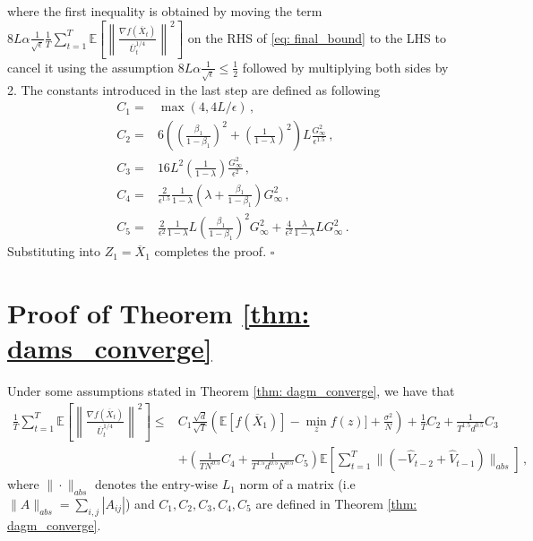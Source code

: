 \documentclass{article} %
\begin{document}
where the first inequality is obtained by moving the term ${8L}\alpha\frac{1}{\sqrt{\epsilon}} \frac{1}{T} \sum_{t=1}^T \mathbb E \left[  \left\| \frac{\nabla f(\overline X_{t})}{{\overline U_t^{1/4}}  } \right\|^2 \right] $ on the RHS of \eqref{eq: final_bound} to the LHS to cancel it using the assumption ${8L}\alpha\frac{1}{\sqrt{\epsilon}} \leq \frac{1}{2} $ followed by multiplying both sides by 2.
The constants introduced in the last step are defined as following
\begin{align}
C_1 = & \max (4, 4{L/\epsilon}) \nonumber \, ,\\
C_2 = & 6 \left(\left( \frac{\beta_1}{1-\beta_1}\right)^2 + \left (\frac{1}{1-\lambda} \right)^2 \right)L  \frac{G_{\infty}^2 }{\epsilon^{1.5}}   \nonumber \, ,\\
C_3 = & 16L^2 \left ( \frac{1}{1-\lambda}\right) \frac{G_{\infty}^2}{\epsilon^2} \nonumber \, ,\\
C_4 = &  \frac{2}{ \epsilon^{1.5}}   \frac{1}{1-\lambda}  \left(     \lambda + \frac{\beta_1}{1-\beta_1}    \right){G_{\infty}^2} \nonumber \, ,\\
C_5 = &  \frac{2}{ \epsilon^{2}}   \frac{1}{1-\lambda}   L   \left ( \frac{\beta_1}{1-\beta_1} \right)^2 {G_{\infty}^2}  + \frac{4}{ \epsilon^{2}}   \frac{\lambda}{1-\lambda}   L    {G_{\infty}^2} \nonumber \, .
\end{align}
Substituting into $Z_1 = \overline X_1$ completes the proof. \hfill $\square$

\vspace{0.2in}

\section{Proof of Theorem \ref{thm: dams_converge}} \label{app: proof_ams}

Under some assumptions stated in Theorem \ref{thm: dagm_converge}, we have that
\begin{align}\label{eq: rep_thm1}
\frac{1}{T}\sum_{t=1}^T  \mathbb E \left [\left\|\frac{\nabla f( \overline X_{t})}{\overline U_{t}^{1/4}}\right\|^2  \right]
\leq  & C_1 \frac{\sqrt{d}}{\sqrt{T}} \left(\mathbb E  [f( \overline X_{1})]  - \min_{z} f(z)]  + \frac{\sigma^2}{N}\right)  +  \frac{ 1}{T} C_2    + \frac{1}{T^{1.5}d^{0.5}} C_3 \nonumber \\ 
&+ \left(  \frac{1}{T N^{0.5} } C_4 + \frac{1}{T^{1.5}d^{0.5} N^{0.5}} C_5  \right) \mathbb E \left[ \sum_{t=1}^{T}   \|    (- \hat V_{t-2} + \hat V_{t-1} ) \|_{abs} \right]  \, ,
\end{align}
where $\| \cdot\|_{abs}$  denotes the entry-wise $L_1$ norm of a matrix (i.e $\| A\|_{abs} = \sum_{i,j}{|A_{ij}|}$) and $C_1, C_2 ,C_3, C_4, C_5$ are defined in Theorem \ref{thm: dagm_converge}. 
\end{document}
